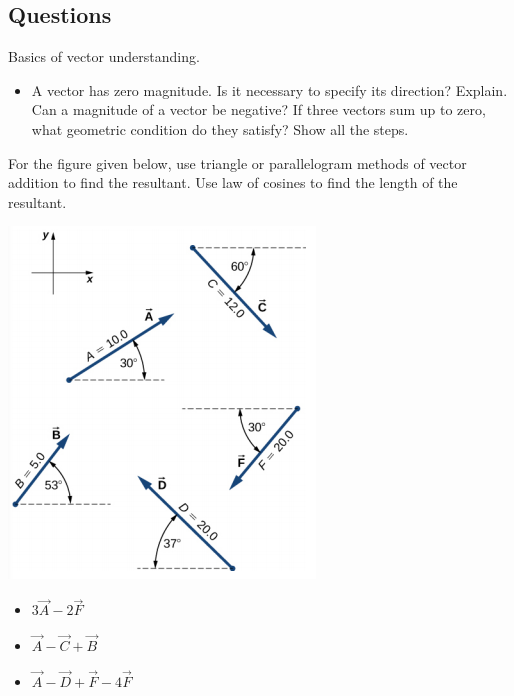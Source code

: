 \documentclass[12pt,addpoints]{exam}
\begin{document}
\begin{questions}
\begin{center}
   			\subsection*{Questions}	
   		\end{center}
   		\question Basics of vector understanding.
   		\begin{itemize}
   			\item A vector has zero magnitude. Is it necessary to specify its direction? Explain. \vspace{1cm}
   			\question Can a magnitude of a vector be negative?\vspace{1cm}
   			\question If three vectors sum up to zero, what geometric condition do they satisfy? Show all the steps. \vspace{1.5in}
   		\end{itemize}
   		\question For the figure given below, use triangle or parallelogram methods of vector addition to find the resultant. Use law of cosines to find the length of the resultant.
   		\begin{center}
   			\includegraphics[scale=0.6]{vectors}
   		\end{center}
   		\begin{itemize}
   			\item $3\vec{A} - 2 \vec{F}$ \vspace{1.5in}
   			\item $\vec{A} -  \vec{C} + \vec{B}$ \vspace{1.5in}
   			\item $\vec{A} -  \vec{D} + \vec{F}-4\vec{F}$ \vspace{1.5in}
   		\end{itemize}

\end{questions}
\end{document}
